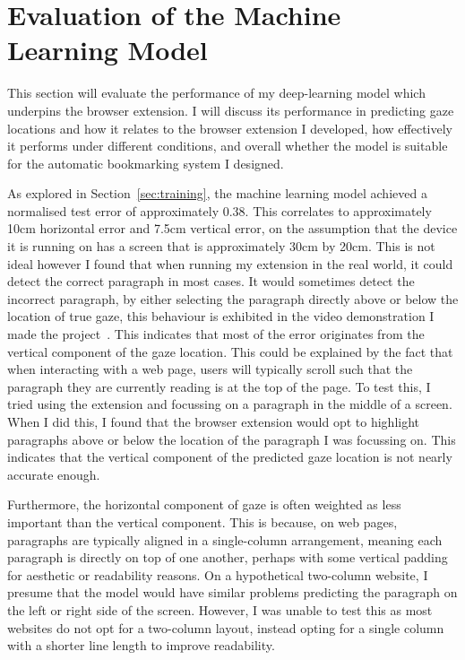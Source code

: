 \documentclass{report}
\begin{document}
\section{Evaluation of the Machine Learning Model}\label{sec:itracker-eval}

This section will evaluate the performance of my deep-learning model which underpins the browser extension. I will discuss its performance in predicting gaze locations and how it relates to the browser extension I developed, how effectively it performs under different conditions, and overall whether the model is suitable for the automatic bookmarking system I designed.

As explored in Section~\ref{sec:training}, the machine learning model achieved a normalised test error of approximately 0.38. This correlates to approximately 10cm horizontal error and 7.5cm vertical error, on the assumption that the device it is running on has a screen that is approximately 30cm by 20cm. This is not ideal however I found that when running my extension in the real world, it could detect the correct paragraph in most cases. It would sometimes detect the incorrect paragraph, by either selecting the paragraph directly above or below the location of true gaze, this behaviour is exhibited in the video demonstration I made the project~\cite{demonstrationVideo}. This indicates that most of the error originates from the vertical component of the gaze location. This could be explained by the fact that when interacting with a web page, users will typically scroll such that the paragraph they are currently reading is at the top of the page. To test this, I tried using the extension and focussing on a paragraph in the middle of a screen. When I did this, I found that the browser extension would opt to highlight paragraphs above or below the location of the paragraph I was focussing on. This indicates that the vertical component of the predicted gaze location is not nearly accurate enough. 

Furthermore, the horizontal component of gaze is often weighted as less important than the vertical component. This is because, on web pages, paragraphs are typically aligned in a single-column arrangement, meaning each paragraph is directly on top of one another, perhaps with some vertical padding for aesthetic or readability reasons. On a hypothetical two-column website, I presume that the model would have similar problems predicting the paragraph on the left or right side of the screen. However, I was unable to test this as most websites do not opt for a two-column layout, instead opting for a single column with a shorter line length to improve readability. 
\end{document}
